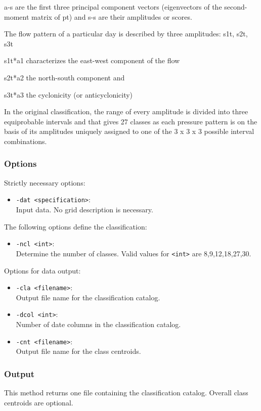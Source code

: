 \documentclass[12pt, oneside, a4paper, headsepline, plainheadsepline]{scrbook}
\begin{document}
a-s are the first three principal component vectors (eigenvectors of the second-moment matrix of pt) and s-s are their amplitudes or scores. 

The flow pattern of a particular day is described by three amplitudes: s1t, s2t, s3t 

	s1t*a1 characterizes the east-west component of the flow 

	s2t*a2 the north-south component and 

	s3t*a3 the cyclonicity (or anticyclonicity) 

In the original classification, the range of every amplitude is divided into three equiprobable intervals and that gives 27 classes as each pressure pattern is on the basis of its amplitudes uniquely assigned to one of the 3 x 3 x 3 possible interval combinations.

\subsubsection*{Options}
Strictly necessary options:
\begin{itemize}
 \item \verb+-dat <specification>+:\\ Input data. No grid description is necessary.
\end{itemize}
The following options define the classification:
\begin{itemize}
 \item \verb+-ncl <int>+:\\ Determine the number of classes. Valid values for \verb+<int>+ are 8,9,12,18,27,30.
\end{itemize}
Options for data output:
\begin{itemize}
 \item \verb+-cla <filename>+:\\ Output file name for the classification catalog.
 \item \verb+-dcol <int>+:\\ Number of date columns in the classification catalog.
 \item \verb+-cnt <filename>+:\\ Output file name for the class centroids.
\end{itemize}

\subsubsection*{Output}
This method returns one file containing the classification catalog. 
Overall class centroids are optional.
\end{document}
